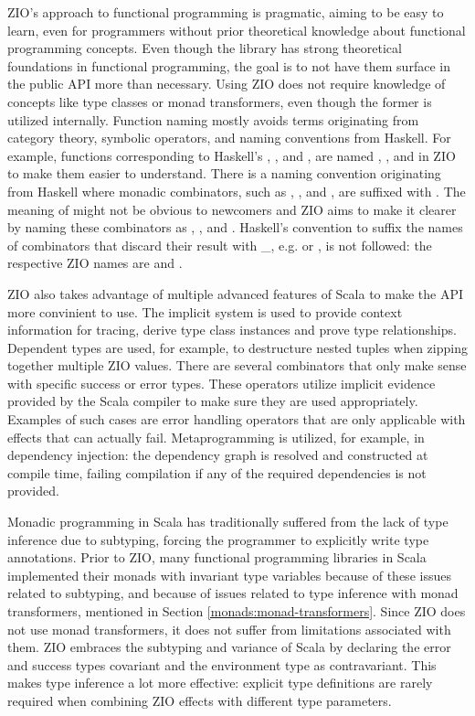 ZIO's approach to functional programming is pragmatic, aiming to be easy to learn, even for programmers without prior theoretical knowledge about functional programming concepts. Even though the library has strong theoretical foundations in functional programming, the goal is to not have them surface in the public API more than necessary. Using ZIO does not require knowledge of concepts like type classes or monad transformers, even though the former is utilized internally. Function naming mostly avoids terms originating from category theory, symbolic operators, and naming conventions from Haskell. For example, functions corresponding to Haskell's , , and , are named , , and  in ZIO to make them easier to understand. There is a naming convention originating from Haskell where monadic combinators, such as , , and , are suffixed with . The meaning of  might not be obvious to newcomers and ZIO aims to make it clearer by naming these combinators as , , and .
Haskell's convention to suffix the names of combinators that discard their result with \_, e.g.  or , is not followed: the respective ZIO names are  and .

ZIO also takes advantage of multiple advanced features of Scala to make the API more convinient to use. The implicit system is used to provide context information for tracing, derive type class instances and prove type relationships. Dependent types are used, for example, to destructure nested tuples when zipping together multiple ZIO values. There are several combinators that only make sense with specific success or error types. These operators utilize implicit evidence provided by the Scala compiler to make sure they are used appropriately. Examples of such cases are error handling operators that are only applicable with effects that can actually fail. Metaprogramming is utilized, for example, in dependency injection: the dependency graph is resolved and constructed at compile time, failing compilation if any of the required dependencies is not provided.

Monadic programming in Scala has traditionally suffered from the lack of type inference due to subtyping, forcing the programmer to explicitly write type annotations. Prior to ZIO, many functional programming libraries in Scala implemented their monads with invariant type variables because of these issues related to subtyping, and because of issues related to type inference with monad transformers, mentioned in Section \ref{monads:monad-transformers}. Since ZIO does not use monad transformers, it does not suffer from limitations associated with them. ZIO embraces the subtyping and variance of Scala by declaring the error and success types covariant and the environment type as contravariant. This makes type inference a lot more effective: explicit type definitions are rarely required when combining ZIO effects with different type parameters.



